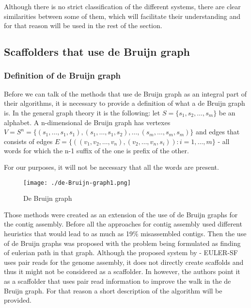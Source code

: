 \documentclass[11pt]{article}
\begin{document}
Although there is no strict classification of the different systems, there are
clear similarities between some of them, which will facilitate their
understanding and for that reason will be used in the rest of the section.

\subsection{Scaffolders that use de Bruijn graph} %
\label{sub:Scaffolders that use de Bruijn graph}

\subsubsection{Definition of de Bruijn graph}
\label{sub:Definition of de Bruijn graph}
Before we can talk of the methods that use de Bruijn graph as an integral part of 
their algorithms, it is necessary to provide a definition of what a de Bruijn graph
is. In the general graph theory it is the following: let $S = \{s_1, s_2, \dots, s_m\}$ be
an alphabet. A n-dimensional de Bruijn graph has vertexes $V = S^n = \{(s_1, \dots, s_1, s_1), 
(s_1, \dots, s_1, s_2), \dots, (s_m, \dots, s_m, s_m)\}$ and edges that consists of
edges $E = \{((v_1, v_2, \dots, v_n), (v_2, \dots, v_n, s_i)) : i = 1, \dots, m\}$ - 
all words for which the n-1 suffix of the one is prefix of the other.

For our purposes, it will not be necessary that all the words are present.

\begin{figure}
  \centering
  \texttt{[image: ./de-Bruijn-graph1.png]}
  \caption{De Bruijn graph}
  \label{fig:de-bruijn-graph}
\end{figure}

Those methods were created as an extension of the use of de Bruijn graphs for
the contig assembly. Before \cite{pevzner} all the approaches for contig
assembly used different heuristics that would lead to as much as 19\%
misassembled contigs. Then the use of de Bruijn graphs was proposed with
the problem being formulated as finding of eulerian path in that graph. Although
the proposed system by \cite{pevzner} - EULER-SF uses pair reads for the genome
assembly, it does not directly create scaffolds and thus it might not be
considered as a scaffolder. In \cite{SOPRA} however, the authors point it as a
scaffolder that uses pair read information to improve the walk in the de Bruijn
graph. For that reason a short description of the algorithm will be provided.
\end{document}

